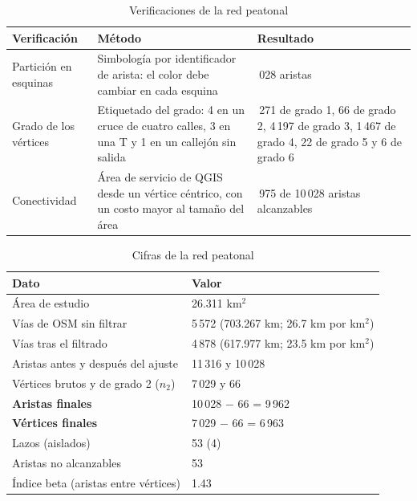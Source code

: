 \begin{table}[htbp]
\centering
\caption{Verificaciones de la red peatonal}
\label{tab:verificacion_red}
\begin{tabular}{|>{\raggedright\arraybackslash}p{}|>{\raggedright\arraybackslash}p{}|>{\raggedright\arraybackslash}p{}|}
\hline
\textbf{Verificación} & \textbf{Método} & \textbf{Resultado} \\ \hline
Partición en esquinas & Simbología por identificador de arista: el color debe cambiar en cada esquina & 10\,028 aristas \\ \hline
Grado de los vértices & Etiquetado del grado: 4 en un cruce de cuatro calles, 3 en una T y 1 en un callejón sin salida & 1\,271 de grado 1, 66 de grado 2, 4\,197 de grado 3, 1\,467 de grado 4, 22 de grado 5 y 6 de grado 6 \\ \hline
Conectividad & Área de servicio de QGIS desde un vértice céntrico, con un costo mayor al tamaño del área & 9\,975 de 10\,028 aristas alcanzables \\ \hline
\end{tabular}
\end{table}

\begin{table}[htbp]
\centering
\caption{Cifras de la red peatonal}
\label{tab:resultados_red}
\begin{tabular}{|l|l|}
\hline
\textbf{Dato} & \textbf{Valor} \\ \hline
Área de estudio & 26.311 km$^2$ \\ \hline
Vías de OSM sin filtrar & 5\,572 (703.267 km; 26.7 km por km$^2$) \\ \hline
Vías tras el filtrado & 4\,878 (617.977 km; 23.5 km por km$^2$) \\ \hline
Aristas antes y después del ajuste & 11\,316 y 10\,028 \\ \hline
Vértices brutos y de grado 2 ($n_2$) & 7\,029 y 66 \\ \hline
\textbf{Aristas finales} & 10\,028 $-$ 66 = 9\,962 \\ \hline
\textbf{Vértices finales} & 7\,029 $-$ 66 = 6\,963 \\ \hline
Lazos (aislados) & 53 (4) \\ \hline
Aristas no alcanzables & 53 \\ \hline
Índice beta (aristas entre vértices) & 1.43 \\ \hline
\end{tabular}
\end{table}

